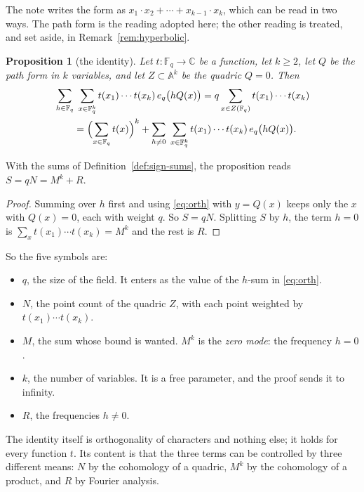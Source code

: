 \documentclass[11pt]{amsbook}
\theoremstyle{plain}
\newtheorem{proposition}[theorem]{Proposition}
\theoremstyle{definition}
\theoremstyle{remark}
\numberwithin{equation}{section}
\numberwithin{figure}{chapter}
\numberwithin{table}{chapter}
\renewcommand{\C}{\mathbb{C}}
\newcommand{\F}{\mathbb{F}}
\begin{document}
The note writes the form as
$x_1 \cdot x_2 + \cdots + x_{k-1}\cdot x_k$, which can be read in
two ways. The path form is the reading adopted here; the other
reading is treated, and set aside, in Remark~\ref{rem:hyperbolic}.

\begin{proposition}[the identity]\label{prop:identity}
Let $t\colon\F_q\to\C$ be a function, let $k\ge2$, let $Q$ be the
path form in $k$ variables, and let $Z\subset\mathbb A^k$ be the
quadric $Q=0$. Then
\begin{align*}
  &\sum_{h\in\F_q}\;\sum_{x\in\F_q^k}
  t(x_1)\cdots t(x_k)\,e_q\bigl(hQ(x)\bigr)
  = q\sum_{x\in Z(\F_q)}t(x_1)\cdots t(x_k)\\
  &\qquad= \Bigl(\sum_{x\in\F_q}t(x)\Bigr)^k
  + \sum_{h\ne0}\;\sum_{x\in\F_q^k}
  t(x_1)\cdots t(x_k)\,e_q\bigl(hQ(x)\bigr).
\end{align*}
\end{proposition}

With the sums of Definition~\ref{def:sign-sums}, the proposition
reads $S = qN = M^k + R$.

\begin{proof}
Summing over $h$ first and using \eqref{eq:orth} with $y = Q(x)$
keeps only the $x$ with $Q(x) = 0$, each with weight $q$. So
$S = qN$. Splitting $S$ by $h$, the term $h = 0$ is
$\sum_x t(x_1)\cdots t(x_k) = M^k$ and the rest is $R$.
\end{proof}

So the five symbols are:
\begin{itemize}
\item $q$, the size of the field. It enters as the value of the
  $h$-sum in \eqref{eq:orth}.
\item $N$, the point count of the quadric $Z$, with each point
  weighted by $t(x_1)\cdots t(x_k)$.
\item $M$, the sum whose bound is wanted. $M^k$ is the \emph{zero
  mode}: the frequency $h = 0$.
\item $k$, the number of variables. It is a free parameter, and the
  proof sends it to infinity.
\item $R$, the frequencies $h \ne 0$.
\end{itemize}
The identity itself is orthogonality of characters and nothing
else; it holds for every function $t$. Its content is that the
three terms can be controlled by three different means: $N$ by the
cohomology of a quadric, $M^k$ by the cohomology of a product, and
$R$ by Fourier analysis.
\end{document}
